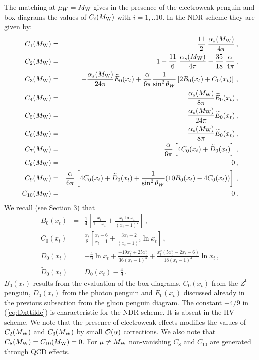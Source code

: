 \documentclass[12pt]{article}
\def\as{\alpha_s}
\newcommand{\mw}{M_{\rm W}}
\newcommand{\aem}{\alpha}
\newcommand{\ord}{{\cal O}}
\begin{document}
\begin{itemize}
\begin{itemize}
The matching at $\mu_W=\mw$ gives in the presence of the electroweak
penguin and box diagrams the values of $C_i(\mw)$ with
 $i=1,..10$. In the NDR scheme they are given by:
\begin{eqnarray}
C_1(\mw) &=&     \frac{11}{2} \; \frac{\as(\mw)}{4\pi} \, ,
\label{eq:CMw1} \\
C_2(\mw) &=& 1 - \frac{11}{6} \; \frac{\as(\mw)}{4\pi}
               - \frac{35}{18} \; \frac{\aem}{4\pi} \, ,
\label{eq:CMw2} \\
C_3(\mw) &=& -\frac{\as(\mw)}{24\pi} \widetilde{E}_0(x_t)
             +\frac{\aem}{6\pi} \frac{1}{\sin^2\theta_W}
             \left[ 2 B_0(x_t) + C_0(x_t) \right] \, , 
\label{eq:CMw3} \\
C_4(\mw) &=& \frac{\as(\mw)}{8\pi} \widetilde{E}_0(x_t) \, ,
\label{eq:CMw4} \\
C_5(\mw) &=& -\frac{\as(\mw)}{24\pi} \widetilde{E}_0(x_t) \, ,
\label{eq:CMw5} \\
C_6(\mw) &=& \frac{\as(\mw)}{8\pi} \widetilde{E}_0(x_t) \, ,
\label{eq:CMw6} \\
C_7(\mw) &=& \frac{\aem}{6\pi} \left[ 4 C_0(x_t) + \widetilde{D}_0(x_t)
\right]\, ,
\label{eq:CMw7} \\
C_8(\mw) &=& 0 \, ,
\label{eq:CMw8} \\
C_9(\mw) &=& \frac{\aem}{6\pi} \left[ 4 C_0(x_t) + \widetilde{D}_0(x_t) +
             \frac{1}{\sin^2\theta_W} (10 B_0(x_t) - 4 C_0(x_t)) \right] \, ,
\label{eq:CMw9} \\
C_{10}(\mw) &=& 0 \, ,
\label{eq:CMw10}
\end{eqnarray}
We recall (see Section 3) that
\begin{eqnarray}
B_0(x_t) &=& \frac{1}{4} \left[ \frac{x_t}{1-x_t} 
+ \frac{x_t \ln x_t}{(x_t-1)^2}
\right]\, , \label{eq:Bxt} \\
C_0(x_t) &=& \frac{x_t}{8} \left[\frac{x_t-6}{x_t-1} 
+ \frac{3 x_t + 2}{(x_t-1)^2}
\ln x_t \right]\, ,
\label{eq:Cxt} \\
D_0(x_t) &=& -\frac{4}{9} \ln x_t + 
\frac{-19 x_t^3 + 25 x_t^2}{36 (x_t-1)^3} +
\frac{x_t^2 (5 x_t^2 - 2 x_t - 6)}{18 (x_t-1)^4} \ln x_t \, ,
\label{eq:Dxt} \\
\widetilde{D}_0(x_t) &=& D_0(x_t) - \frac{4}{9} \, .
\label{eq:Dxttilde} 
\end{eqnarray}
$B_0(x_t)$
results from the evaluation of the box diagrams, $C_0(x_t)$ from the
$Z^0$-penguin, $D_0(x_t)$ from the photon penguin and $E_0(x_t)$ 
discussed already in the previous subsection 
from the gluon penguin diagram.
The constant $-4/9$ in (\ref{eq:Dxttilde})
is characteristic for the NDR scheme. It is absent in the HV scheme.
We note that the presence of electroweak effects modifies the
values of $C_2(\mw)$ and $C_3(\mw)$ by small $\ord(\alpha)$ corrections.
We also note that $C_8(\mw)=C_{10}(\mw)=0$. For $\mu\not=\mw$ non-vanishing
$C_8$ and $C_{10}$ are generated through QCD effects.


\end{itemize}
\end{itemize}
\end{document}
